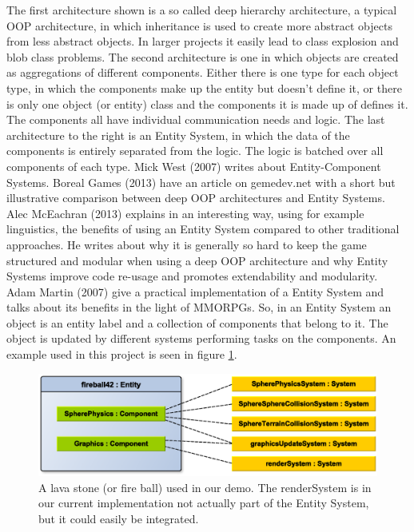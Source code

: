 The first architecture shown is a so called deep hierarchy architecture, a typical OOP architecture, in which inheritance is used to create more abstract objects from less abstract objects. In larger projects it easily lead to class explosion and blob class problems. The second architecture is one in which objects are created as aggregations of different components. Either there is one type for each object type, in which the components make up the entity but doesn't define it, or there is only one object (or entity) class and the components it is made up of defines it. The components all have individual communication needs and logic. The last architecture to the right is an Entity System, in which the data of the components is entirely separated from the logic. The logic is batched over all components of each type. Mick West (2007) writes about Entity-Component Systems. Boreal Games (2013) have an article on gemedev.net with a short but illustrative comparison between deep OOP architectures and Entity Systems. Alec McEachran (2013) explains in an interesting way, using for example linguistics, the benefits of using an Entity System compared to other traditional approaches. He writes about why it is generally so hard to keep the game structured and modular when using a deep OOP architecture and why Entity Systems improve code re-usage and promotes extendability and modularity. Adam Martin (2007) give a practical implementation of a Entity System and talks about its benefits in the light of MMORPGs. 	
\newpage
So, in an Entity System an object is an entity label and a collection of components that belong to it. The object is updated by different systems performing tasks on the components. An example used in this project is seen in figure \ref{fig:EntityComponentSystemExample}.
\begin{figure}[H]
  \centering
  \includegraphics[width=0.9\linewidth]{images/EntityComponentSystemExample.eps}
  \caption{A lava stone (or fire ball) used in our demo. The renderSystem is in our current implementation not actually part of the Entity System, but it could easily be integrated. }
  \label{fig:EntityComponentSystemExample}
\end{figure}
